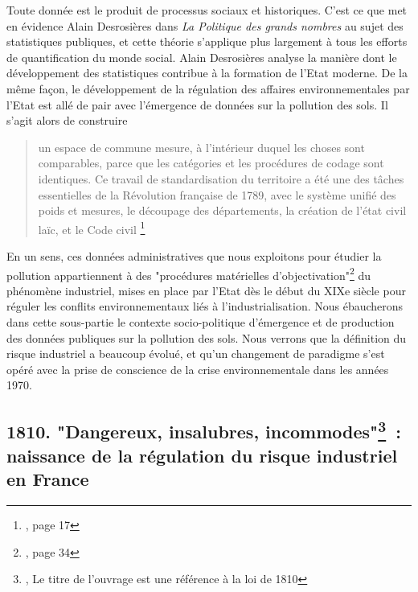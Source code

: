 \documentclass[a4paper,twoside,12pt]{book}
\begin{document}
Toute donnée est le produit de processus sociaux et historiques. C'est ce que met en évidence Alain Desrosières dans \textit{La Politique des grands nombres} au sujet des statistiques publiques, et cette théorie s'applique plus largement à tous les efforts de quantification du monde social. Alain Desrosières analyse la manière dont le développement des statistiques contribue à la formation de l'Etat moderne. De la même façon, le développement de la régulation des affaires environnementales par l'Etat est allé de pair avec l'émergence de données sur la pollution des sols. Il s'agit alors de construire 

\vspace{1em}
\begin{quote}
\og un espace de commune mesure, à l'intérieur duquel les choses sont comparables, parce que les catégories et les procédures de codage sont identiques. Ce travail de standardisation du territoire a été une des tâches essentielles de la Révolution française de 1789, avec le système unifié des poids et mesures, le découpage des départements, la création de l'état civil laïc, et le Code civil \fg{} \footnote{\cite{desrosieres_politique_2010}, page 17}
\end{quote}
\vspace{1em}


En un sens, ces données administratives que nous exploitons pour étudier la pollution appartiennent à des "procédures matérielles d'objectivation"\footnote{\cite{desrosieres_politique_2010}, page 34} du phénomène industriel, mises en place par l'Etat dès le début du XIXe siècle pour réguler les conflits environnementaux liés à l'industrialisation. Nous ébaucherons dans cette sous-partie le contexte socio-politique d'émergence et de production des données publiques sur la pollution des sols. Nous verrons que la définition du risque industriel a beaucoup évolué, et qu'un changement de paradigme s'est opéré avec la prise de conscience de la crise environnementale dans les années 1970. 

\subsection{1810. "Dangereux, insalubres, incommodes"\thanks{\cite{guillerme_dangereux_2004}, Le titre de l'ouvrage est une référence à la loi de 1810} : naissance de la régulation du risque industriel en France}
\end{document}
